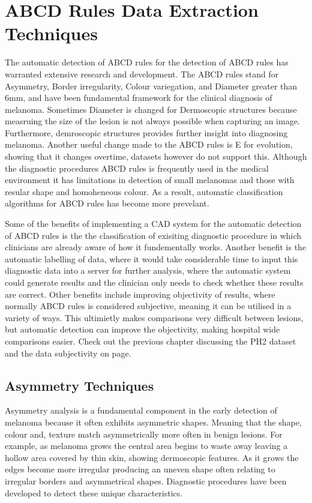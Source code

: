 \section{ABCD Rules Data Extraction Techniques}
The automatic detection of ABCD rules for the detection of ABCD rules has warranted extensive research and development\cite{Ali2020}. The ABCD rules stand for Asymmetry, Border irregularity, Colour variegation, and Diameter greater than 6mm, and have been fundamental framework for the clinical diagnosis of melanoma. Sometimes Diameter is changed for Dermoscopic structures because measruing the size of the lesion is not always possible when capturing an image. Furthermore, demroscopic structures provides further insight into diagnosing melanoma\cite{}. Another useful change made to the ABCD rules is E for evolution, showing that it changes overtime, datasets however do not support this. Although the diagnostic procedures ABCD rules is frequently used in the medical environment it has limitations in detection of small melanomas and those with resular shape and homoheneous colour\cite{Argenziano2006}. As a result, automatic classification algorithms for ABCD rules has become more prevelant\cite{Kasmi2016}.

Some of the benefits of implementing a CAD system for the automatic detection of ABCD rules is the the classification of exisiting diagnostic procedure in which clinicians are already aware of how it fundementally works. Another benefit is the automatic labelling of data, where it would take considerable time to input this diagnostic data into a server for further analysis, where the automatic system could generate results and the clinician only needs to check whether these results are correct. Other benefits include improving objectivity of results, where normally ABCD rules is considered subjective, meaning it can be utilised in a variety of ways. This ultimietly makes comparisons very difficult between lesions, but automatic detection can improve the objectivity, making hospital wide comparisons easier. Check out the previous chapter discussing the PH2 dataset and the data subjectivity on page\pageref*{ph2-image-assessment}.

\subsection{Asymmetry Techniques}
Asymmetry analysis is a fundamental component in the early detection of melanoma because it often exhibits asymmetric shapes\cite{Ali2020a}. Meaning that the shape, colour and, texture match asymmetrically more often in benign lesions. For example, as melanoma grows the central area begins to waste away leaving a hollow area covered by thin skin, showing dermoscopic features. As it grows the edges become more irregular producing an uneven shape often relating to irregular borders and asymmetrical shapes. Diagnostic procedures have been developed to detect these unique characteristics.

